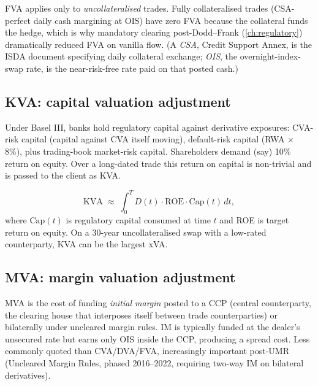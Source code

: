 FVA applies only to \emph{uncollateralised} trades.  Fully
collateralised trades (CSA-perfect daily cash margining at OIS)
have zero FVA because the collateral funds the hedge, which is
why mandatory clearing post-Dodd--Frank (\cref{ch:regulatory})
dramatically reduced FVA on vanilla flow.  (A \emph{CSA}, Credit
Support Annex, is the ISDA document specifying daily collateral
exchange; \emph{OIS}, the overnight-index-swap rate, is the
near-risk-free rate paid on that posted cash.)

\subsection{KVA: capital valuation adjustment}

Under Basel III, banks hold regulatory capital against derivative
exposures: CVA-risk capital (capital against CVA itself moving),
default-risk capital (RWA $\times$ 8\%), plus trading-book
market-risk capital.  Shareholders demand (say) 10\% return on
equity.  Over a long-dated trade this return on capital is
non-trivial and is passed to the client as KVA.

\[
  \mathrm{KVA}
  \;\approx\; \int_0^T D(t) \cdot
              \mathrm{ROE} \cdot \mathrm{Cap}(t)\, dt,
\]
where $\mathrm{Cap}(t)$ is regulatory capital consumed at time $t$
and ROE is target return on equity.  On a 30-year uncollateralised
swap with a low-rated counterparty, KVA can be the largest xVA.

\subsection{MVA: margin valuation adjustment}

MVA is the cost of funding \emph{initial margin} posted to a CCP
(central counterparty, the clearing house that interposes itself
between trade counterparties) or bilaterally under uncleared
margin rules.  IM is typically funded at the dealer's unsecured
rate but earns only OIS inside the CCP, producing a spread cost.
Less commonly quoted than CVA/DVA/FVA, increasingly important
post-UMR (Uncleared Margin Rules, phased 2016--2022, requiring
two-way IM on bilateral derivatives).

